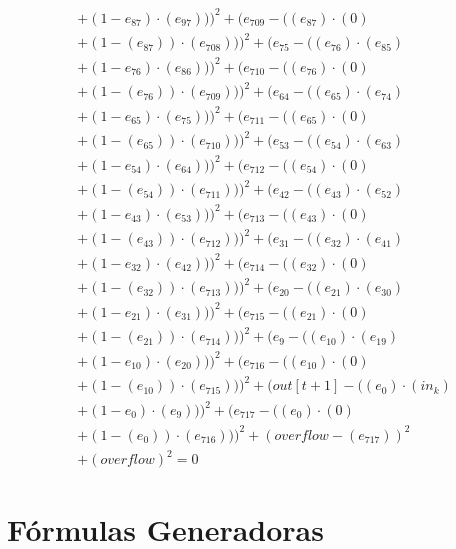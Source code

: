 \documentclass[10pt, a4paper]{article}
\begin{document}
\begin{align*}
& + (1 - e_{87})  \cdot  (e_{97})))^{2} + (e_{709} - ((e_{87}) \cdot (0) \\
& + (1 - (e_{87})) \cdot (e_{708})))^{2} + (e_{75} - ((e_{76})  \cdot  (e_{85}) \\
& + (1 - e_{76})  \cdot  (e_{86})))^{2} + (e_{710} - ((e_{76}) \cdot (0) \\
& + (1 - (e_{76})) \cdot (e_{709})))^{2} + (e_{64} - ((e_{65})  \cdot  (e_{74}) \\
& + (1 - e_{65})  \cdot  (e_{75})))^{2} + (e_{711} - ((e_{65}) \cdot (0) \\
& + (1 - (e_{65})) \cdot (e_{710})))^{2} + (e_{53} - ((e_{54})  \cdot  (e_{63}) \\
& + (1 - e_{54})  \cdot  (e_{64})))^{2} + (e_{712} - ((e_{54}) \cdot (0) \\
& + (1 - (e_{54})) \cdot (e_{711})))^{2} + (e_{42} - ((e_{43})  \cdot  (e_{52}) \\
& + (1 - e_{43})  \cdot  (e_{53})))^{2} + (e_{713} - ((e_{43}) \cdot (0) \\
& + (1 - (e_{43})) \cdot (e_{712})))^{2} + (e_{31} - ((e_{32})  \cdot  (e_{41}) \\
& + (1 - e_{32})  \cdot  (e_{42})))^{2} + (e_{714} - ((e_{32}) \cdot (0) \\
& + (1 - (e_{32})) \cdot (e_{713})))^{2} + (e_{20} - ((e_{21})  \cdot  (e_{30}) \\
& + (1 - e_{21})  \cdot  (e_{31})))^{2} + (e_{715} - ((e_{21}) \cdot (0) \\
& + (1 - (e_{21})) \cdot (e_{714})))^{2} + (e_{9} - ((e_{10})  \cdot  (e_{19}) \\
& + (1 - e_{10})  \cdot  (e_{20})))^{2} + (e_{716} - ((e_{10}) \cdot (0) \\
& + (1 - (e_{10})) \cdot (e_{715})))^{2} + (out[t+1] - ((e_{0})  \cdot  (in_k) \\
& + (1 - e_{0})  \cdot  (e_{9})))^{2} + (e_{717} - ((e_{0}) \cdot (0) \\
& + (1 - (e_{0})) \cdot (e_{716})))^{2} + (overflow - (e_{717}))^{2} \\
& + (overflow)^{2} = 0
\end{align*}\part{Fórmulas Generadoras}
\end{document}
